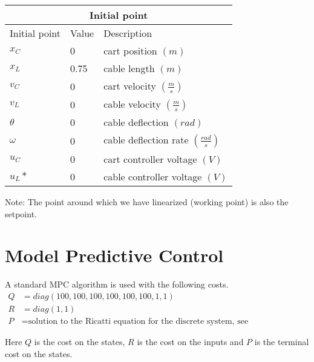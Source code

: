 \documentclass[12pt]{article}
\begin{document}
\begin{table}[!ht]
\centering
\begin{tabular}{| l | l | l |}
\hline
\multicolumn{3}{|c|}{\textbf{Initial point}} \\
\hline
Initial point & Value & Description \\
\hline 
$x_C$ & 0    & cart position $(m)$ \\
$x_L$ & 0.75 & cable length $(m)$ \\
$v_C$ & 0    & cart velocity $(\frac{m}{s})$ \\
$v_L$ & 0    & cable velocity $(\frac{m}{s})$ \\
$\theta$ & 0 & cable deflection $(rad)$ \\
$\omega$ & 0 & cable deflection rate $(\frac{rad}{s})$ \\
$u_C$ & 0 & cart controller voltage $(V)$ \\
$u_L*$ & 0 & cable controller voltage $(V)$ \\
\hline
\end{tabular}
\end{table}

Note: The point around which we have linearized (working point) is also the setpoint.

\newpage
\section{Model Predictive Control}
A standard MPC algorithm is used with the following costs.
\begin{equation}
\begin{aligned}
Q &= diag(100, 100, 100, 100, 100, 100, 1, 1) \\
R &= diag(1,1) \\
P &= \text{solution to the Ricatti equation for the discrete system, see craneInformation.m}
\end{aligned}
\end{equation}

Here $Q$ is the cost on the states, $R$ is the cost on the inputs and $P$ is the terminal cost on the states.
\end{document}
